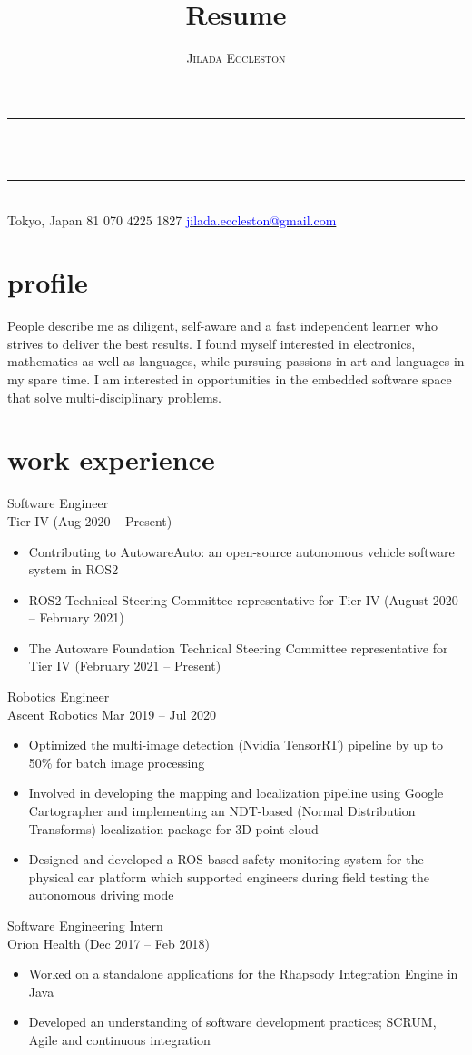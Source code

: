 \documentclass[10pt, a4paper]{article}
\makeatletter
\renewcommand{\maketitle}{
  \begin{center}
    \rule{\textwidth}{0.4pt}\\
    \medskip
    {\Huge\theauthor}\\
    \medskip
    \rule[1.0\baselineskip]{\textwidth}{0.4pt}\\
    \vspace{-1.0em}
    Tokyo, Japan \ding{118}
    \raisebox{0.3ex}{\footnotesize+}81 070\,$\,4225\,$\,1827 \ding{118}
    \href{mailto:jilada.eccleston@gmail.com}{
      \textcolor{blue}{
        jilada.eccleston@gmail.com
      }
    }
  \end{center}
}
\makeatother
\begin{document}
\author{\textsc{Jilada Eccleston}}
\title{Resume}

\maketitle

\section{profile}
  People describe me as diligent, self-aware and a fast independent learner who strives to deliver the best results. I found myself interested in
  electronics, mathematics as well as languages, while pursuing passions in art and languages in my spare time. I am interested in
  opportunities in the embedded software space that solve multi-disciplinary problems.

\section{work experience}
  Software Engineer\\
  Tier IV (Aug 2020 -- Present)\\
  \begin{itemize}
    \item Contributing to AutowareAuto: an open-source autonomous vehicle software system in ROS2
    \item ROS2 Technical Steering Committee representative for Tier IV (August 2020 -- February 2021)
    \item The Autoware Foundation Technical Steering Committee representative for Tier IV (February 2021 -- Present)
  \end{itemize}
  Robotics Engineer\\
  Ascent Robotics {Mar 2019 -- Jul 2020}\\
  \begin{itemize}
    \item Optimized the multi-image detection (Nvidia TensorRT) pipeline by up to 50\% for batch image processing
    \item Involved in developing the mapping and localization pipeline using Google Cartographer and implementing an NDT-based (Normal Distribution Transforms) localization package for 3D point cloud
    \item Designed and developed a ROS-based safety monitoring system for the physical car platform which supported engineers during field testing the autonomous driving mode
  \end{itemize}
  Software Engineering Intern\\
  Orion Health (Dec 2017 -- Feb 2018)\\
  \begin{itemize}
    \item Worked on a standalone applications for the Rhapsody Integration Engine in Java
    \item Developed an understanding of software development practices; SCRUM, Agile and continuous integration
  \end{itemize}
\end{document}

